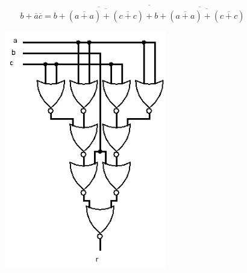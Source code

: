 \documentclass[10pt,a4paper]{article}
\begin{document}
\begin{equation}
b + \overline{a}\overline{c} = \overline{\overline{b + \overline{(\overline{a + a}) + (\overline{c + c})}} + \overline{b + \overline{(\overline{a + a}) + (\overline{c + c})}}}
\end{equation}
\begin{figure}[H]
\includegraphics[width=200pt]{9_8}
\end{figure}
\end{document}
